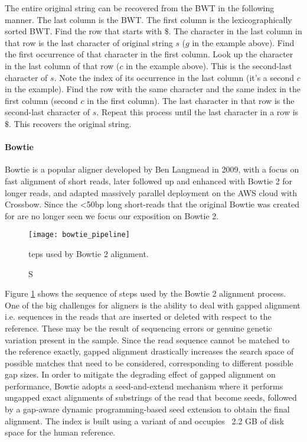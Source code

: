 The entire original string can be recovered from the BWT in the following manner. The last column is the BWT. The first column is the lexicographically sorted BWT. Find the row that starts with $\$$. The character in the last column in that row is the last character of original string $s$ ($g$ in the example above). Find the first occurrence of that character in the first column. Look up the character in the last column of that row ($c$ in the example above). This is the second-last character of $s$. Note the index of its occurrence in the last column (it's a second $c$ in the example). Find the row with the same character and the same index in the first column (second $c$ in the first column). The last character in that row is the second-last character of $s$. Repeat this process until the last character in a row is $\$$. This recovers the original string.

\paragraph{Bowtie}

Bowtie is a popular aligner developed by Ben Langmead in 2009, with a focus on fast alignment of short reads\autocite{langmead2009ultrafast}, later followed up and enhanced with Bowtie 2 for longer reads\autocite{langmead2012fast}, and adapted massively parallel deployment on the AWS cloud with Crossbow\autocite{langmead2009searching}. Since the <50bp long short-reads that the original Bowtie was created for are no longer seen we focus our exposition on Bowtie 2.

\begin{figure}[H]
    \texttt{[image: bowtie\_pipeline]}
    \centering
    \caption Steps used by Bowtie 2 alignment.\autocite{langmead2012fast}
    \label{fig:bowtie_pipeline}
\end{figure}

Figure \ref{fig:bowtie_pipeline} shows the sequence of steps used by the Bowtie 2 alignment process. One of the big challenges for aligners is the ability to deal with gapped alignment i.e. sequences in the reads that are inserted or deleted with respect to the reference. These may be the result of sequencing errors or genuine genetic variation present in the sample. Since the read sequence cannot be matched to the reference exactly, gapped alignment drastically increases the search space of possible matches that need to be considered, corresponding to different possible gap sizes. In order to mitigate the degrading effect of gapped alignment on performance, Bowtie adopts a seed-and-extend mechanism where it performs ungapped exact alignments of substrings of the read that become seeds, followed by a gap-aware dynamic programming-based seed extension to obtain the final alignment. The index is built using a variant of \autocite{karkkainen2003simple} and occupies ~2.2 GB of disk space for the human reference.

